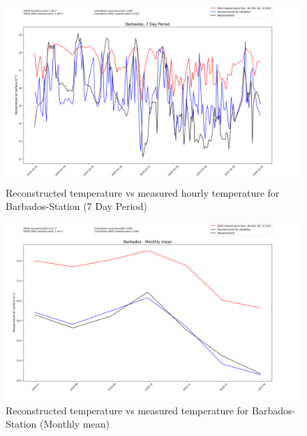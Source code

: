 \begin{figure}
    \centering
    \includegraphics[width=1.02\textwidth]{resources/images/charts/barbados_eval_grib_final/Barbados, 7 Day Period_1_2_3.png}
    \caption{Reconstructed temperature vs measured hourly temperature for Barbados-Station (7 Day Period)}
\end{figure}

\begin{figure}
    \centering
    \includegraphics[width=1.02\textwidth]{resources/images/charts/barbados_eval_grib_final/Barbados - Monthly mean.png}
    \caption{Reconstructed temperature vs measured temperature for Barbados-Station (Monthly mean)}
\end{figure}

\newpage